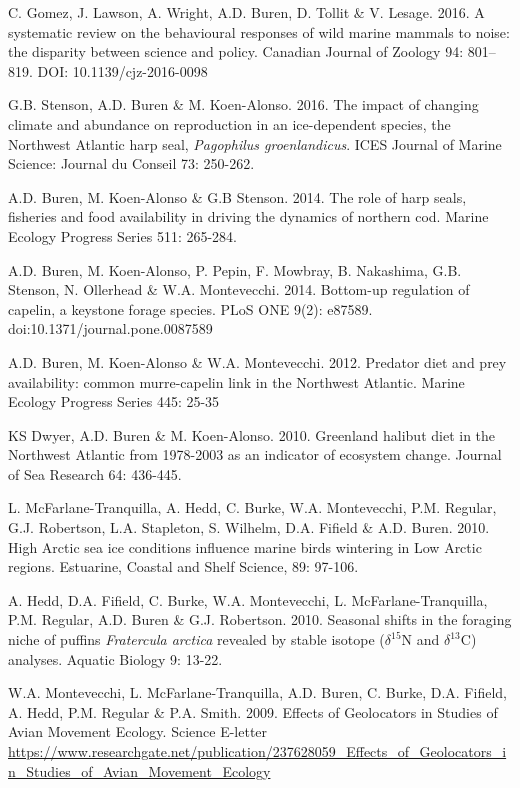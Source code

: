 \documentclass{res}
\begin{document}
\begin{resume}
\begin{hangparas}{.4in}{1}
C. Gomez, J. Lawson, A. Wright, A.D. Buren, D. Tollit \& V. Lesage. 2016. A systematic review on the behavioural responses of wild marine mammals to noise: the disparity between science and policy. Canadian Journal of Zoology 94: 801–819. DOI: 10.1139/cjz-2016-0098

G.B. Stenson, A.D. Buren \& M. Koen-Alonso. 2016. The impact of changing climate and abundance on reproduction in an ice-dependent species, the Northwest Atlantic harp seal, \textit{Pagophilus groenlandicus}. ICES Journal of Marine Science: Journal du Conseil 73: 250-262.

A.D. Buren, M. Koen-Alonso \& G.B Stenson. 2014. The role of harp seals, fisheries and food availability in driving the dynamics of northern cod. Marine Ecology Progress Series 511: 265-284.

A.D. Buren, M. Koen-Alonso, P. Pepin, F. Mowbray, B. Nakashima, G.B. Stenson, N. Ollerhead \& W.A. Montevecchi. 2014. Bottom-up regulation of capelin, a keystone forage species. PLoS ONE 9(2): e87589. doi:10.1371/journal.pone.0087589

A.D. Buren, M. Koen-Alonso \& W.A. Montevecchi. 2012. Predator diet and prey availability: common murre-capelin link in the Northwest Atlantic. Marine Ecology Progress Series 445: 25-35

KS Dwyer, A.D. Buren \& M. Koen-Alonso. 2010. Greenland halibut diet in the Northwest Atlantic from 1978-2003 as an indicator of ecosystem change. Journal of Sea Research 64: 436-445. 

L. McFarlane-Tranquilla, A. Hedd, C. Burke, W.A. Montevecchi, P.M. Regular, G.J. Robertson, L.A. Stapleton, S. Wilhelm, D.A. Fifield \& A.D. Buren. 2010. High Arctic sea ice conditions influence marine birds wintering in Low Arctic regions. Estuarine, Coastal and Shelf Science, 89: 97-106.

A. Hedd, D.A. Fifield, C. Burke, W.A. Montevecchi, L. McFarlane-Tranquilla, P.M. Regular, A.D. Buren \& G.J. Robertson. 2010. Seasonal shifts in the foraging niche of puffins \textit{Fratercula arctica} revealed by stable isotope ($\delta^{15}$N and $\delta^{13}$C) analyses. Aquatic Biology 9: 13-22.

W.A. Montevecchi, L. McFarlane-Tranquilla, A.D. Buren, C. Burke, D.A. Fifield, A. Hedd, P.M. Regular \& P.A. Smith. 2009. Effects of Geolocators in Studies of Avian Movement Ecology. Science E-letter \url{https://www.researchgate.net/publication/237628059_Effects_of_Geolocators_in_Studies_of_Avian_Movement_Ecology}


\end{hangparas}
\end{resume}
\end{document}
